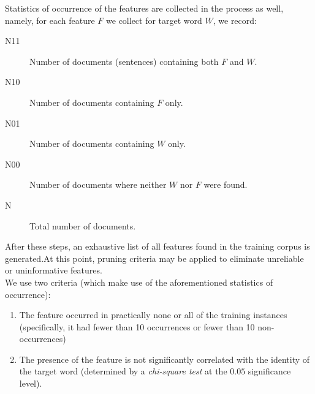 Statistics of occurrence of the features are collected in the process as well,
namely, for each feature \(F\) we collect for target word \(W\), we record:
\begin{description}
    \item [N11] Number of documents (sentences) containing both \(F\) and \(W\).
    \item [N10] Number of documents containing \(F\) only.
    \item [N01] Number of documents containing \(W\) only.
    \item [N00] Number of documents where neither \(W\) nor \(F\) were found.
    \item [N] Total number of documents.
\end{description}


After these steps, an exhaustive list of all features found in the training
corpus is generated.At this point, pruning criteria may be applied to eliminate unreliable or
uninformative features.\\
We use two criteria (which make use of the aforementioned statistics of
occurrence):
\begin{enumerate}
    \item The feature occurred in practically none or all of the training instances (specifically, it had fewer than 10 occurrences or fewer than 10 non-occurrences)
    \item The presence of the feature is not significantly correlated with the identity of the target word (determined by a \textit{chi-square test} at the \(0.05\) significance level).
\end{enumerate}
